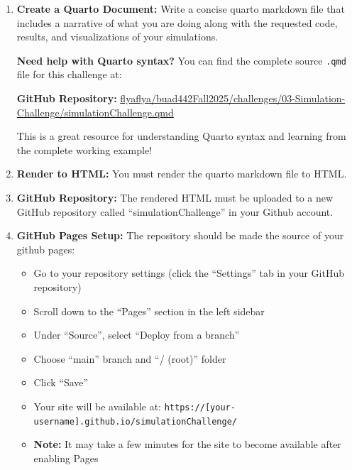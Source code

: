 \documentclass[
  letterpaper,
  DIV=11,
  numbers=noendperiod]{scrartcl}
\providecommand{\tightlist}{%
  \setlength{\itemsep}{0pt}\setlength{\parskip}{0pt}}
\theoremstyle{definition}
\theoremstyle{remark}
\begin{document}
\begin{enumerate}
\def\labelenumi{\arabic{enumi}.}
\item
  \textbf{Create a Quarto Document:} Write a concise quarto markdown
  file that includes a narrative of what you are doing along with the
  requested code, results, and visualizations of your simulations.

  \begin{tcolorbox}[enhanced jigsaw, opacityback=0, rightrule=.15mm, titlerule=0mm, breakable, colback=white, bottomtitle=1mm, toptitle=1mm, colframe=quarto-callout-tip-color-frame, toprule=.15mm, coltitle=black, colbacktitle=quarto-callout-tip-color!10!white, title=\textcolor{quarto-callout-tip-color}{\faLightbulb}\hspace{0.5em}{💡 Pro Tip: Source File Reference}, arc=.35mm, opacitybacktitle=0.6, bottomrule=.15mm, leftrule=.75mm, left=2mm]

  \textbf{Need help with Quarto syntax?} You can find the complete
  source \texttt{.qmd} file for this challenge at:

  \textbf{GitHub Repository:}
  \href{https://github.com/flyaflya/buad442Fall2025/blob/main/challenges/03-Simulation-Challenge/simulationChallenge.qmd}{flyaflya/buad442Fall2025/challenges/03-Simulation-Challenge/simulationChallenge.qmd}

  This is a great resource for understanding Quarto syntax and learning
  from the complete working example!

  \end{tcolorbox}
\item
  \textbf{Render to HTML:} You must render the quarto markdown file to
  HTML.
\item
  \textbf{GitHub Repository:} The rendered HTML must be uploaded to a
  new GitHub repository called ``simulationChallenge'' in your Github
  account.
\item
  \textbf{GitHub Pages Setup:} The repository should be made the source
  of your github pages:

  \begin{itemize}
  \tightlist
  \item
    Go to your repository settings (click the ``Settings'' tab in your
    GitHub repository)
  \item
    Scroll down to the ``Pages'' section in the left sidebar
  \item
    Under ``Source'', select ``Deploy from a branch''
  \item
    Choose ``main'' branch and ``/ (root)'' folder
  \item
    Click ``Save''
  \item
    Your site will be available at:
    \texttt{https://{[}your-username{]}.github.io/simulationChallenge/}
  \item
    \textbf{Note:} It may take a few minutes for the site to become
    available after enabling Pages
  \end{itemize}
\end{enumerate}
\end{document}
